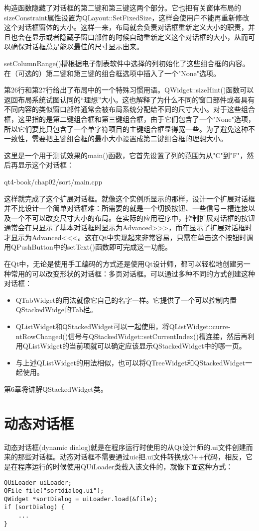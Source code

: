 \documentclass[11pt,oneside]{book}
\begin{document}
\begin{common-format}
构造函数隐藏了对话框的第二键和第三键这两个部分。它也把有关窗体布局的sizeConstraint属性设置为QLayout::SetFixedSize，这样会使用户不能再重新修改这个对话框窗体的大小。这样一来，布局就会负责对话框重新定义大小的职责，并且也会在显示或者隐藏子窗口部件的时候自动重新定义这个对话框的大小，从而可以确保对话框总是能以最佳的尺寸显示出来。

setColumnRange()槽根据电子制表软件中选择的列初始化了这些组合框的内容。在（可选的）第二键和第三键的组合框选项中插入了一个"None"选项。

第26行和第27行给出了布局中的一个特殊习惯用语。QWidget::sizeHint()函数可以返回布局系统试图认同的“理想”大小。这也解释了为什么不同的窗口部件或者具有不同内容的类似窗口部件通常会被布局系统分配给不同的尺寸大小。对于这些组合框，这里指的是第二键组合框和第三键组合框，由于它们包含了一个"None"选项，所以它们要比只包含了一个单字符项目的主键组合框显得宽一些。为了避免这种不一致性，需要把主键组合框的最小大小设置成第二键组合框的理想大小。

这里是一个用于测试效果的main()函数，它首先设置了列的范围为从"C"到"F"，然后再显示这个对话框：
\begin{cppinput}{qt4-book/chap02/sort/main.cpp}
\end{cppinput}

这样就完成了这个扩展对话框。就像这个实例所显示的那样，设计一个扩展对话框并不比设计一个简单对话框难：所需要的就是一个切换按钮、一些信号－槽连接以及一个不可以改变尺寸大小的布局。在实际的应用程序中，控制扩展对话框的按钮通常会在只显示了基本对话框时显示为Advanced>>>，而在显示了扩展对话框时才显示为Advanced<<<。这在Qt中实现起来非常容易，只需在单击这个按钮时调用QPushButton中的setText()函数即可完成这一功能。

在Qt中，无论是使用手工编码的方式还是使用Qt设计师，都可以轻松地创建另一种常用的可以改变形状的对话框：多页对话框。可以通过多种不同的方式创建这种对话框：
\begin{itemize}
\item QTabWidget的用法就像它自己的名字一样。它提供了一个可以控制内置QStackedWidge的Tab栏。
\item QListWidget和QStackedWidget可以一起使用，将QListWidget::curre-ntRowChanged()信号与QStackedWidget::setCurrentIndex()槽连接，然后再利用QListWidget的当前项就可以确定应该显示QStackedWidget中的哪一页。
\item 与上述QListWidget的用法相似，也可以将QTreeWidget和QStackedWidget一起使用。
\end{itemize}

第6章将讲解QStackedWidget类。

\section{动态对话框}
动态对话框(dynamic dialog)就是在程序运行时使用的从Qt设计师的.ui文件创建而来的那些对话框。动态对话框不需要通过uic把.ui文件转换成C++代码，相反，它是在程序运行的时候使用QUiLoader类载入该文件的，就像下面这种方式：
\begin{Verbatim}
QUiLoader uiLoader;
QFile file("sortdialog.ui");
QWidget *sortDialog = uiLoader.load(&file);
if (sortDialog) {
    ...
}
\end{Verbatim}


\end{common-format}
\end{document}
